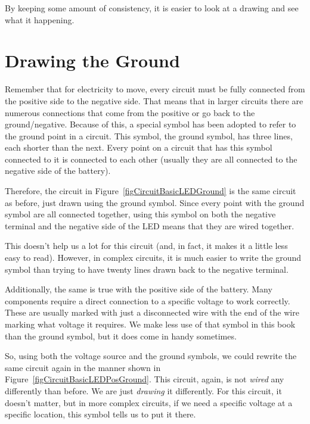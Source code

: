 By keeping some amount of consistency, it is easier to look at a drawing and see what it happening.

\section{Drawing the Ground}

Remember that for electricity to move, every circuit must be fully connected from the positive side to the negative side.
That means that in larger circuits there are numerous connections that come from the positive or go back to the ground/negative.
Because of this, a special symbol has been adopted to refer to the ground point in a circuit.
This symbol, the ground symbol, has three lines, each shorter than the next.
Every point on a circuit that has this symbol connected to it is connected to each other (usually they are all connected to the negative side of the battery).

Therefore, the circuit in Figure~\ref{figCircuitBasicLEDGround} is the same circuit as before, just drawn using the ground symbol.
Since every point with the ground symbol are all connected together, using this symbol on both the negative terminal and the negative side of the LED means that they are wired together.

This doesn't help us a lot for this circuit (and, in fact, it makes it a little less easy to read).  
However, in complex circuits, it is much easier to write the ground symbol than trying to have twenty lines drawn back to the negative terminal.


Additionally, the same is true with the positive side of the battery.
Many components require a direct connection to a specific voltage to work correctly.
These are usually marked with just a disconnected wire with the end of the wire marking what voltage it requires.
We make less use of that symbol in this book than the ground symbol, but it does come in handy sometimes.

So, using both the voltage source and the ground symbols, we could rewrite the same circuit again in the manner shown in Figure~\ref{figCircuitBasicLEDPosGround}.
This circuit, again, is not \emph{wired} any differently than before.
We are just \emph{drawing} it differently.
For this circuit, it doesn't matter, but in more complex circuits, if we need a specific voltage at a specific location, this symbol tells us to put it there.

